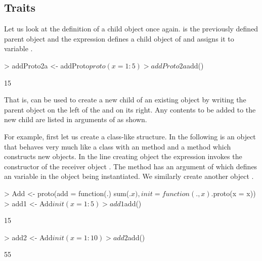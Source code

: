 \documentclass{Z}
\begin{document}
\subsection{Traits}
\label{sec:traits}

Let us look at the definition of a child object once again.
 is the previously defined parent object
and the expression  defines
a child object of  and assigns it to variable
.

\begin{Schunk}
\begin{Sinput}
> addProto2a <- addProto$proto(x = 1:5)
> addProto2a$add()
\end{Sinput}
\begin{Soutput}
[1] 15
\end{Soutput}
\end{Schunk}

That is,  can be used to create a new child of
an existing object by writing the 
parent object on the left of the \code{\$} and 
 on its right.  Any contents to
be added to the new child are listed in arguments of 
as shown.

For example, first let us create a class-like structure.  In the
following  is an object that behaves very much like a class
with an  method and a method  which constructs
new objects.  In the line creating object  the expression
 invokes the  constructor of the
receiver object . The method  has an argument of
 which defines an  variable in the 
object being instantiated. We similarly create another object
.

\begin{Schunk}
\begin{Sinput}
> Add <- proto(add = function(.) sum(.$x), init = function(., x) .$proto(x = x))
> add1 <- Add$init(x = 1:5)
> add1$add()
\end{Sinput}
\begin{Soutput}
[1] 15
\end{Soutput}
\begin{Sinput}
> add2 <- Add$init(x = 1:10)
> add2$add()
\end{Sinput}
\begin{Soutput}
[1] 55
\end{Soutput}
\end{Schunk}
\end{document}

